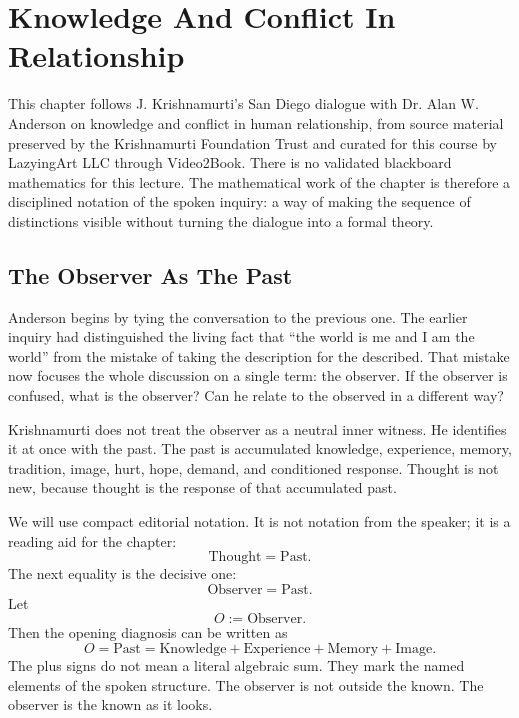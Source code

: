 \chapter{Knowledge And Conflict In Relationship}

This chapter follows J. Krishnamurti's San Diego dialogue with Dr. Alan W. Anderson on knowledge and conflict in human relationship, from source material preserved by the Krishnamurti Foundation Trust and curated for this course by LazyingArt LLC through Video2Book. There is no validated blackboard mathematics for this lecture. The mathematical work of the chapter is therefore a disciplined notation of the spoken inquiry: a way of making the sequence of distinctions visible without turning the dialogue into a formal theory.

\section{The Observer As The Past}

Anderson begins by tying the conversation to the previous one. The earlier inquiry had distinguished the living fact that ``the world is me and I am the world'' from the mistake of taking the description for the described. That mistake now focuses the whole discussion on a single term: the observer. If the observer is confused, what is the observer? Can he relate to the observed in a different way?

Krishnamurti does not treat the observer as a neutral inner witness. He identifies it at once with the past. The past is accumulated knowledge, experience, memory, tradition, image, hurt, hope, demand, and conditioned response. Thought is not new, because thought is the response of that accumulated past.

We will use compact editorial notation. It is not notation from the speaker; it is a reading aid for the chapter:
\begin{equation}
\mathrm{Thought}=\mathrm{Past}.
\end{equation}
The next equality is the decisive one:
\begin{equation}
\mathrm{Observer}=\mathrm{Past}.
\end{equation}
Let
\begin{equation}
O:=\mathrm{Observer}.
\end{equation}
Then the opening diagnosis can be written as
\begin{equation}
O=\mathrm{Past}
=\mathrm{Knowledge}+\mathrm{Experience}+\mathrm{Memory}+\mathrm{Image}.
\end{equation}
The plus signs do not mean a literal algebraic sum. They mark the named elements of the spoken structure. The observer is not outside the known. The observer is the known as it looks.

